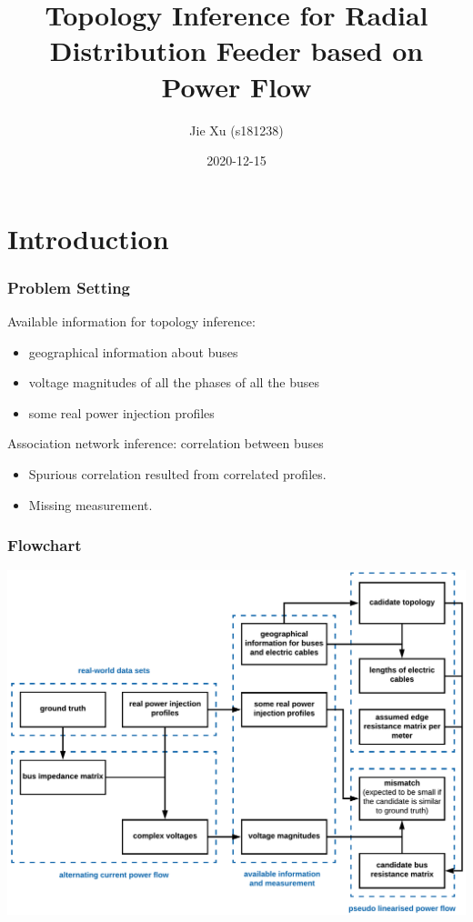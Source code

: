\documentclass[
]{book}
\title{Topology Inference for Radial Distribution Feeder based on Power Flow}
\author{Jie Xu (s181238)}
\date{2020-12-15}
\providecommand{\tightlist}{%
  \setlength{\itemsep}{0pt}\setlength{\parskip}{0pt}}
\begin{document}
\maketitle

{
\setcounter{tocdepth}{1}
\tableofcontents
}
\hypertarget{introduction}{%
\chapter{Introduction}\label{introduction}}

\hypertarget{problem-setting}{%
\subsection*{Problem Setting}\label{problem-setting}}

Available information for topology inference:

\begin{itemize}
\tightlist
\item
  geographical information about buses
\item
  voltage magnitudes of all the phases of all the buses
\item
  some real power injection profiles
\end{itemize}

Association network inference: correlation between buses

\begin{itemize}
\tightlist
\item
  Spurious correlation resulted from correlated profiles.
\item
  Missing measurement.
\end{itemize}

\hypertarget{flowchart}{%
\subsection*{Flowchart}\label{flowchart}}

\includegraphics{Pictures/figFlowchart3.png}
\end{document}
